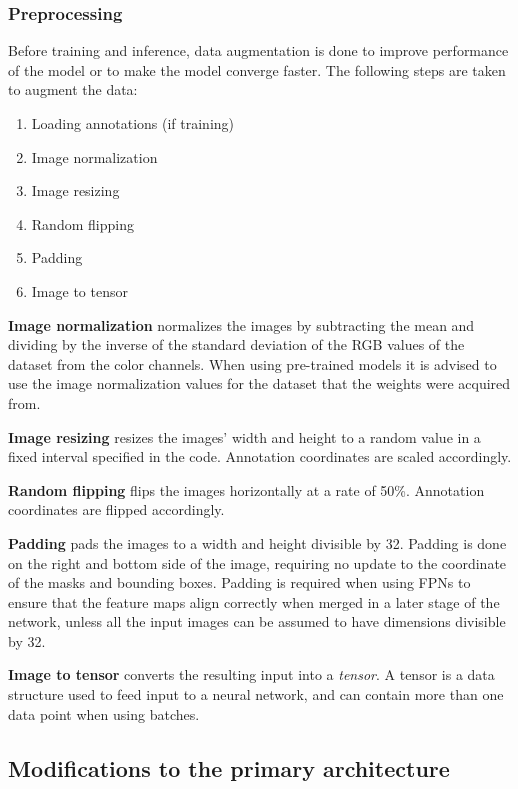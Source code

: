 \documentclass[oneside, english, bibtex]{kththesis}
\begin{document}
\subsubsection{Preprocessing}
\label{subs:preprocessing}

Before training and inference, data augmentation is done to improve performance of the model or to make the model converge faster. The following steps are taken to augment the data:

\begin{enumerate}
\item Loading annotations (if training)
\item Image normalization
\item Image resizing
\item Random flipping
\item Padding
\item Image to tensor
\end{enumerate}

\textbf{Image normalization} normalizes the images by subtracting the mean and dividing by the inverse of the standard deviation of the RGB values of the dataset from the color channels.
When using pre-trained models it is advised to use the image normalization values for the dataset that the weights were acquired from.

\textbf{Image resizing} resizes the images' width and height to a random value in a fixed interval specified in the code. Annotation coordinates are scaled accordingly.

\textbf{Random flipping} flips the images horizontally at a rate of 50\%. Annotation coordinates are flipped accordingly.

\textbf{Padding} pads the images to a width and height divisible by 32.
Padding is done on the right and bottom side of the image, requiring no update to the coordinate of the masks and bounding boxes.
Padding is required when using FPNs to ensure that the feature maps align correctly when merged in a later stage of the network, unless all the input images can be assumed to have dimensions divisible by 32.

\textbf{Image to tensor} converts the resulting input into a \textit{tensor}.
A tensor is a data structure used to feed input to a neural network, and can contain more than one data point when using batches.


\subsection{Modifications to the primary architecture}
\end{document}
